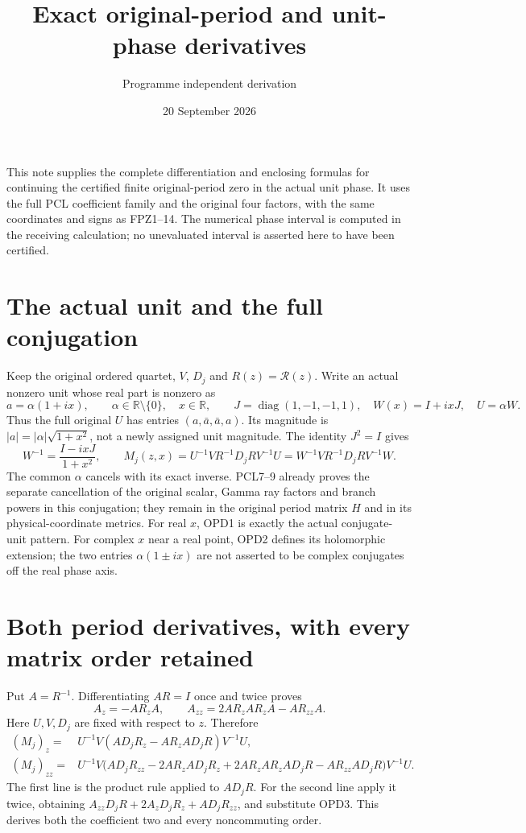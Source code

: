 \documentclass[11pt]{article}
\title{Exact original-period and unit-phase derivatives}
\author{Programme independent derivation}
\date{20 September 2026}
\newcommand{\diag}{\operatorname{diag}}
\begin{document}
\maketitle

This note supplies the complete differentiation and enclosing formulas
for continuing the certified finite original-period zero in the actual
unit phase. It uses the full PCL coefficient family and the original
four factors, with the same coordinates and signs as FPZ1--14.
The numerical phase interval is computed in the receiving calculation;
no unevaluated interval is asserted here to have been certified.

\section{The actual unit and the full conjugation}
Keep the original ordered quartet, $V$, $D_j$ and $R(z)=\mathcal R(z)$.
Write an actual nonzero unit whose real part is nonzero as
\[
 a=\alpha(1+ix),\qquad \alpha\in\mathbb R\setminus\{0\},
 \quad x\in\mathbb R,\qquad
 J=\diag(1,-1,-1,1),\quad W(x)=I+ixJ,\quad U=\alpha W.
 \tag{OPD1}
\]
Thus the full original $U$ has entries $(a,\bar a,\bar a,a)$.
Its magnitude is $|a|=|\alpha|\sqrt{1+x^2}$, not a newly assigned
unit magnitude. The identity $J^2=I$ gives
\[
 W^{-1}=\frac{I-ixJ}{1+x^2},\qquad
 M_j(z,x)=U^{-1}VR^{-1}D_jRV^{-1}U
         =W^{-1}VR^{-1}D_jRV^{-1}W.
 \tag{OPD2}
\]
The common $\alpha$ cancels with its exact inverse. PCL7--9 already
proves the separate cancellation of the original scalar, Gamma ray
factors and branch powers in this conjugation; they remain in the
original period matrix $H$ and in its physical-coordinate metrics.
For real $x$, OPD1 is exactly the actual conjugate-unit pattern.
For complex $x$ near a real point, OPD2 defines its holomorphic
extension; the two entries $\alpha(1\pm ix)$ are not asserted to
be complex conjugates off the real phase axis.

\section{Both period derivatives, with every matrix order retained}
Put $A=R^{-1}$. Differentiating $AR=I$ once and twice proves
\[
 A_z=-AR_zA,\qquad
 A_{zz}=2AR_zAR_zA-AR_{zz}A.
 \tag{OPD3}
\]
Here $U,V,D_j$ are fixed with respect to $z$. Therefore
\[
 \begin{split}
 (M_j)_z={}&U^{-1}V
       (AD_jR_z-AR_zAD_jR)V^{-1}U,\\
 (M_j)_{zz}={}&U^{-1}V\bigl(
       AD_jR_{zz}-2AR_zAD_jR_z
       +2AR_zAR_zAD_jR-AR_{zz}AD_jR
                         \bigr)V^{-1}U.
 \end{split}\tag{OPD4}
\]
The first line is the product rule applied to $AD_jR$.
For the second line apply it twice, obtaining
$A_{zz}D_jR+2A_zD_jR_z+AD_jR_{zz}$, and substitute OPD3.
This derives both the coefficient two and every noncommuting order.
\end{document}
